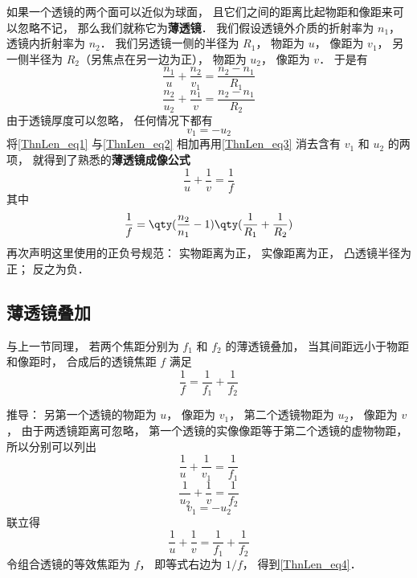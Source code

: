 如果一个透镜的两个面可以近似为球面， 且它们之间的距离比起物距和像距来可以忽略不记， 那么我们就称它为\textbf{薄透镜}． 我们假设透镜外介质的折射率为 $n_1$， 透镜内折射率为 $n_2$． 我们另透镜一侧的半径为 $R_1$， 物距为 $u$， 像距为 $v_1$， 另一侧半径为 $R_2$（另焦点在另一边为正）， 物距为 $u_2$， 像距为 $v$． 于是有
\begin{equation}\label{ThnLen_eq1}
\frac{n_1}{u} + \frac{n_2}{v_1} = \frac{n_2 - n_1}{R_1}
\end{equation}
\begin{equation}\label{ThnLen_eq2}
\frac{n_2}{u_2} + \frac{n_1}{v} = \frac{n_2 - n_1}{R_2}
\end{equation}
由于透镜厚度可以忽略， 任何情况下都有
\begin{equation}\label{ThnLen_eq3}
v_1 = -u_2
\end{equation}
将\autoref{ThnLen_eq1} 与\autoref{ThnLen_eq2} 相加再用\autoref{ThnLen_eq3} 消去含有 $v_1$ 和 $u_2$ 的两项， 就得到了熟悉的\textbf{薄透镜成像公式}
\begin{equation}
\frac{1}{u} + \frac{1}{v} = \frac{1}{f}
\end{equation}
其中
\begin{equation}
\frac{1}{f} = \qty(\frac{n_2}{n_1} - 1) \qty(\frac{1}{R_1} + \frac{1}{R_2})
\end{equation}
再次声明这里使用的正负号规范： 实物距离为正， 实像距离为正， 凸透镜半径为正； 反之为负．


\subsection{薄透镜叠加}
与上一节同理， 若两个焦距分别为 $f_1$ 和 $f_2$ 的薄透镜叠加， 当其间距远小于物距和像距时， 合成后的透镜焦距 $f$ 满足
\begin{equation}\label{ThnLen_eq4}
\frac{1}{f} = \frac{1}{f_1} + \frac{1}{f_2}
\end{equation}

推导： 另第一个透镜的物距为 $u$， 像距为 $v_1$， 第二个透镜物距为 $u_2$， 像距为 $v$， 由于两透镜距离可忽略， 第一个透镜的实像像距等于第二个透镜的虚物物距， 所以分别可以列出
\begin{equation}
\frac{1}{u} + \frac{1}{v_1} = \frac{1}{f_1}
\end{equation}
\begin{equation}
\frac{1}{u_2} + \frac{1}{v} = \frac{1}{f_2}
\end{equation}
\begin{equation}
v_1 = -u_2
\end{equation}
联立得
\begin{equation}
\frac{1}{u} + \frac{1}{v} = \frac{1}{f_1} + \frac{1}{f_2}
\end{equation}
令组合透镜的等效焦距为 $f$， 即等式右边为 $1/f$， 得到\autoref{ThnLen_eq4}．
